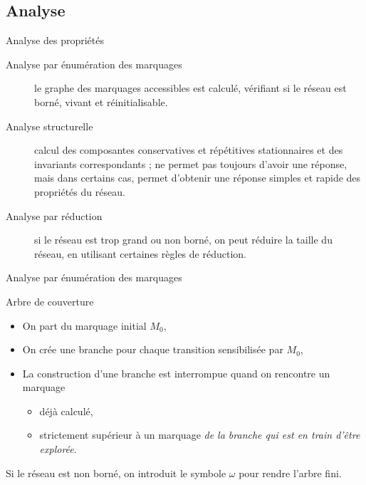 \documentclass[compress]{beamer}
\begin{document}

\subsection{Analyse}
\begin{frame}{Analyse des propriétés}
\begin{description}
\item[Analyse par énumération des marquages] le graphe des marquages accessibles est calculé, vérifiant si le réseau est borné, vivant et réinitialisable.
\item[Analyse structurelle] calcul des composantes conservatives et répétitives stationnaires et des invariants correspondants ; ne permet pas toujours d'avoir une réponse, mais dans certains cas, permet d'obtenir une réponse simples et rapide des propriétés du réseau.
\item[Analyse par réduction] si le réseau est trop grand ou non borné, on peut réduire la taille du réseau, en utilisant certaines règles de réduction.
\end{description}
\end{frame}
 
\begin{frame}{Analyse par énumération des marquages}
\begin{block}{Arbre de couverture}
\begin{itemize}
\item On part du marquage initial $M_0$,
\item On crée une branche pour chaque transition sensibilisée par $M_0$,
\item La construction d'une branche est interrompue quand on rencontre un marquage
	\begin{itemize}
	\item déjà calculé,
	\item strictement supérieur à un marquage {\em de la branche qui est en train d'être explorée}.
	\end{itemize}
\end{itemize}  
Si le réseau est non borné, on introduit le symbole $\omega$ pour rendre l'arbre fini.
\end{block}
\end{frame}  
 
\end{document}

